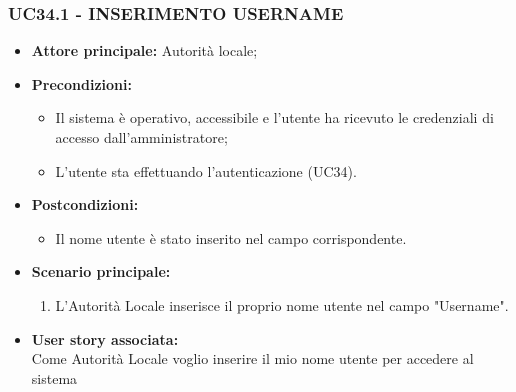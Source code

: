 \subsubsection{UC34.1 - INSERIMENTO USERNAME}
\begin{itemize}
    \item \textbf{Attore principale:} Autorità locale;
    \item \textbf{Precondizioni:}
        \begin{itemize}
            \item Il sistema è operativo, accessibile e l’utente ha ricevuto le credenziali di accesso dall'amministratore;
            \item L’utente sta effettuando l’autenticazione (UC34).
        \end{itemize}
    \item \textbf{Postcondizioni:}
        \begin{itemize}
            \item Il nome utente è stato inserito nel campo corrispondente.
        \end{itemize}
    \item \textbf{Scenario principale:}
        \begin{enumerate}
            \item L'Autorità Locale inserisce il proprio nome utente nel campo "Username".
        \end{enumerate}
    \item \textbf{User story associata:} \\
    Come Autorità Locale voglio inserire il mio nome utente per accedere al sistema
\end{itemize}
